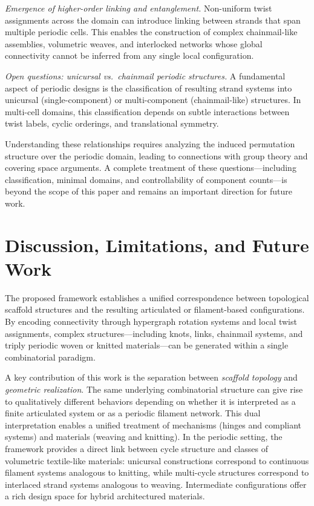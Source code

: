 \documentclass[acmtog]{acmart}
\begin{document}
\textit{Emergence of higher-order linking and entanglement.}
Non-uniform twist assignments across the domain can introduce linking between strands that span multiple periodic cells. This enables the construction of complex chainmail-like assemblies, volumetric weaves, and interlocked networks whose global connectivity cannot be inferred from any single local configuration.

\textit{Open questions: unicursal vs.\ chainmail periodic structures.}
A fundamental aspect of periodic designs is the classification of resulting strand systems into unicursal (single-component) or multi-component (chainmail-like) structures. In multi-cell domains, this classification depends on subtle interactions between twist labels, cyclic orderings, and translational symmetry.

Understanding these relationships requires analyzing the induced permutation structure over the periodic domain, leading to connections with group theory and covering space arguments. A complete treatment of these questions—including classification, minimal domains, and controllability of component counts—is beyond the scope of this paper and remains an important direction for future work.




\section{Discussion, Limitations, and Future Work}
\label{sec:discussion}

The proposed framework establishes a unified correspondence between topological scaffold structures and the resulting articulated or filament-based configurations. By encoding connectivity through hypergraph rotation systems and local twist assignments, complex structures---including knots, links, chainmail systems, and triply periodic woven or knitted materials---can be generated within a single combinatorial paradigm.

A key contribution of this work is the separation between \emph{scaffold topology} and \emph{geometric realization}. The same underlying combinatorial structure can give rise to qualitatively different behaviors depending on whether it is interpreted as a finite articulated system or as a periodic filament network. This dual interpretation enables a unified treatment of mechanisms (hinges and compliant systems) and materials (weaving and knitting). In the periodic setting, the framework provides a direct link between cycle structure and classes of volumetric textile-like materials: unicursal constructions correspond to continuous filament systems analogous to knitting, while multi-cycle structures correspond to interlaced strand systems analogous to weaving. Intermediate configurations offer a rich design space for hybrid architectured materials.
\end{document}
